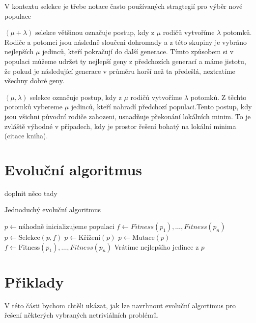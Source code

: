 V kontextu selekce je třebe notace často používaných stragtegií pro výběr nové populace

$(\mu + \lambda)$ selekce většinou označuje postup, kdy z $\mu$ rodičů vytvoříme $\lambda$ potomků. Rodiče a potomci jsou následně sloučeni dohromady a z této skupiny je vybráno nejlepších $\mu$ jedinců, kteří pokračují do další generace. Tímto způsobem si v populaci můžeme udržet ty nejlepší geny z předchozích generací a máme jistotu, že pokud je následující generace v průměru horší než ta předešlá, neztratíme všechny dobré geny.

$(\mu, \lambda)$ selekce označuje postup, kdy z $\mu$ rodičů vytvoříme $\lambda$ potomků. Z těchto potomků vybereme $\mu$ jedinců, kteří nahradí předchozí populaci.Tento postup, kdy jsou všichni původní rodiče zahozeni, usnadňuje překonání lokálních minim. To je zvláště výhodné v případech, kdy je prostor řešení bohatý na lokální minima (citace kniha). 

\section{Evoluční algoritmus}

doplnit něco tady

\begin{algorithm}
\caption{Jednoduchý evoluční algoritmus}
\begin{algorithmic}[1]  %
	\State $p \gets \mbox{náhodně inicializujeme populaci}$
    \State $f \gets Fitness(p_1), \dots, Fitness(p_n)$ 
		\State $p \gets \mbox{Selekce}(p, f)$
		\State $p \gets \mbox{Křížení}(p)$
		\State $p \gets \mbox{Mutace}(p)$
        \State $f \gets \mbox{Fitness}(p_1), \dots, Fitness(p_n)$
    \EndWhile
    \State Vrátíme nejlepšího jedince z $p$
\EndFunction
\end{algorithmic}
\end{algorithm}




\section{Přiklady}

V této části bychom chtěli ukázat, jak lze navrhnout evoluční algortimus pro řešení některých vybraných netriviálních problémů.

